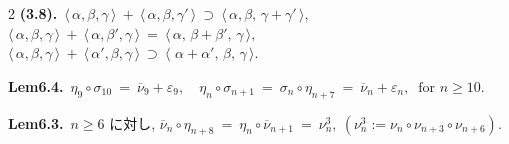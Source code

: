 \documentclass[10pt, leqno]{ltjsarticle}
\newcommand{\todas}[1]{\langle\,#1\,\rangle}
\numberwithin{equation}{section}
\theoremstyle{plain}
\theoremstyle{definition}
\theoremstyle{remark}
\begin{document}
\begin{paracol}{2}
\noindent
\textbf{(3.8).}\
\(\todas{\alpha,\beta,\gamma}\ +\ \todas{\alpha,\beta,\gamma'}\ \supset\
\todas{\alpha,\beta,\,\gamma+\gamma'},\)\\
\(\todas{\alpha,\beta,\gamma}\ +\ \todas{\alpha,\beta',\gamma}\ =\
\todas{\alpha,\,\beta+\beta',\,\gamma},\)\\
\(\todas{\alpha,\beta,\gamma}\ +\ \todas{\alpha',\beta,\gamma}\ \supset\
\todas{\,\alpha+\alpha',\,\beta,\,\gamma}.\)

\noindent
\textbf{Lem6.4.}\
\(\eta_9\circ \sigma_{10}\ =\ \overline\nu_9+\varepsilon_9,
\quad \eta_n\circ \sigma_{n+1}\ =\ 
\sigma_n \circ\eta_{n+7}\ =\
\overline\nu_n+\varepsilon_n,\ \text{ for } n\ge10.\)

\noindent
\textbf{Lem6.3.}\
\(n\ge6\) に対し,
\(\overline\nu_n\circ \eta_{n+8}\ 
=\ \eta_n\circ \overline\nu_{n+1}\ =\ \nu_n^{3},
\ (\nu_n^{3}:=\nu_n\circ \nu_{n+3}\circ \nu_{n+6}).\)



\end{paracol}
\end{document}
